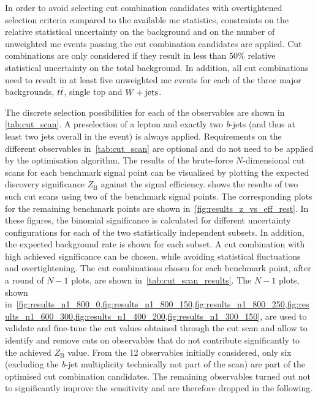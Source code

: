 In order to avoid selecting cut combination candidates with overtightened selection criteria compared to the available \gls{mc} statistics, constraints on the relative statistical uncertainty on the background and on the number of unweighted \gls{mc} events passing the cut combination candidates are applied.
Cut combinations are only considered if they result in less than 50\% relative statistical uncertainty on the total background.
In addition, all cut combinations need to result in at least five unweighted \gls{mc} events for each of the three major backgrounds, $t\bar{t}$, single top and $W+\mathrm{jets}$.

The discrete selection possibilities for each of the observables are shown in \cref{tab:cut_scan}.
A preselection of a lepton and exactly two \textit{b}-jets (and thus at least two jets overall in the event) is always applied. Requirements on the different observables in~\cref{tab:cut_scan} are optional and do not need to be applied by the optimisation algorithm.
The results of the brute-force $N$-dimensional cut scans for each benchmark signal point can be visualised by plotting the expected discovery significance $Z_\mathrm{B}$ against the signal efficiency.
 shows the results of two such cut scans using two of the benchmark signal points.
The corresponding plots for the remaining benchmark points are shown in~\cref{fig:results_z_vs_eff_rest}. In these figures, the binomial significance is calculated for different uncertainty configurations for each of the two statistically independent subsets.
In addition, the expected background rate is shown for each subset.
A cut combination with high achieved significance can be chosen, while avoiding statistical fluctuations and overtightening.
The cut combinations chosen for each benchmark point, after a round of $N-1$ plots, are shown in~\cref{tab:cut_scan_results}. The $N-1$ plots, shown in~\cref{fig:results_n1_800_0,fig:results_n1_800_150,fig:results_n1_800_250,fig:results_n1_600_300,fig:results_n1_400_200,fig:results_n1_300_150}, are used to validate and fine-tune the cut values obtained through the cut scan and allow to identify and remove cuts on observables that do not contribute significantly to the achieved $Z_\mathrm{B}$ value.
From the 12 observables initially considered, only six (excluding the \textit{b}-jet multiplicity technically not part of the scan) are part of the optimised cut combination candidates.
The remaining observables turned out not to significantly improve the sensitivity and are therefore dropped in the following.


